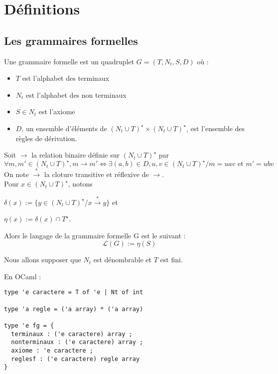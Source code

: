 \documentclass[a4paper,12pt]{article}
\title{\letitle}
\author{\leauthor}
\date{}
\begin{document}
    
\maketitle
\tableofcontents

\section{Définitions}

\subsection{Les grammaires formelles}

Une grammaire formelle est un quadruplet $G = (T,N_t,S,D)$ où :

\begin{itemize}
\item $T$ est l'alphabet des terminaux
\item $N_t$ est l'alphabet des non terminaux
\item $S \in N_t$ est l'axiome
\item $D$, un ensemble d'éléments de $(N_t \cup T)^\star \times (N_t \cup T)^\star$, est l'ensemble des règles de dérivation.
\end{itemize}

Soit $\rightarrow$ la relation binaire définie sur $(N_t \cup T)^\star$ par
\begin{equation}
\forall m,m' \in (N_t \cup T)^\star, m \rightarrow m' \iff \exists (a,b) \in D, u,v \in (N_t \cup T)^\star / m = uav \text{ et } m' = ubv
\end{equation}
On note $\overset{*}{\rightarrow}$ la cloture transitive et réflexive de $\rightarrow$.\\
Pour $x \in (N_t \cup T)^\star$, notons

$\delta(x) := \{y \in (N_t \cup T)^\star / x \overset{*}{\rightarrow} y\}$
et 

$\eta(x) := \delta(x) \cap T^\star$.

Alors le langage de la grammaire formelle  G est le suivant :
\begin{equation*}\mathcal{L} (G) := \eta(S)\end{equation*}

Nous allons supposer que $N_t$ est dénombrable et $T$ est fini.

En OCaml :
{\color{DarkBlue}\begin{verbatim}
type 'e caractere = T of 'e | Nt of int

type 'a regle = ('a array) * ('a array)

type 'e fg = {
  terminaux : ('e caractere) array ;
  nonterminaux : ('e caractere) array ;
  axiome : 'e caractere ;
  reglesf : ('e caractere) regle array
} 
\end{verbatim}}
\end{document}
